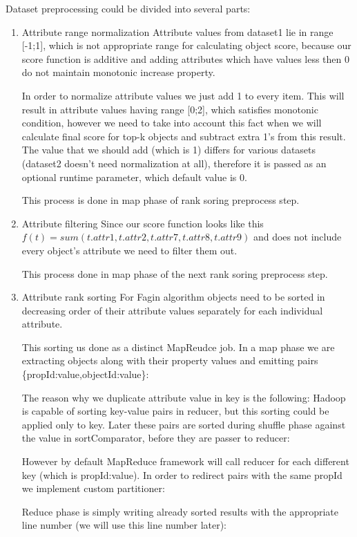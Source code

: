 \documentclass[a4paper]{article}
\begin{document}
Dataset preprocessing could be divided into several parts:
\begin{enumerate}
	\item Attribute range normalization
		Attribute values from dataset1 lie in range [-1;1], which is not appropriate range for calculating object score, because our score function is additive and adding attributes which have values less then 0 do not maintain monotonic increase property.
		
		In order to normalize attribute values we just add 1 to every item.
		This will result in attribute values having range [0;2], which satisfies monotonic condition, however we need to take into account this fact when we will calculate final score for top-k objects and subtract extra 1's from this result. The value that we should add (which is 1) differs for various datasets (dataset2 doesn't need normalization at all), therefore it is passed as an optional runtime parameter, which default value is 0.  

		This process is done in map phase of rank soring preprocess step.
	\item Attribute filtering
		Since our score function looks like this $f(t) = sum( t.attr1, t.attr2, t.attr7, t.attr8, t.attr9)$ and does not include every object's attribute we need to filter them out.

		This process done in map phase of the next rank soring preprocess step.
 	\item Attribute rank sorting
 		For Fagin algorithm objects need to be sorted in decreasing order of their attribute values separately for each individual attribute.

 		This sorting us done as a distinct MapReudce job. 
 		In a map phase we are extracting objects along with their property values and emitting pairs \{propId:value,objectId:value\}:    
 		
 		
 		The reason why we duplicate attribute value in key is the following: Hadoop is capable of sorting key-value pairs in reducer, but this sorting could be applied only to key. Later these pairs are sorted during shuffle phase against the value in sortComparator, before they are passer to reducer:
		
 		
 		However by default MapReduce framework will call reducer for each different key (which is propId:value). In order to redirect pairs with the same propId we implement custom partitioner:
 		

 		Reduce phase is simply writing already sorted results with the appropriate line number (we will use this line number later): 
 		
\end{enumerate}
\end{document}
